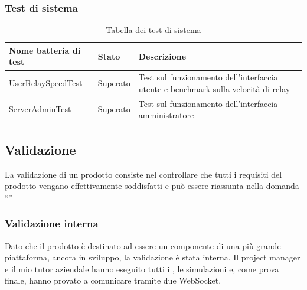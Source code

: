 		\subsubsection{Test di sistema}
		\begin{table}[H]
			\centering
			\begin{tabularx}{\textwidth}{ X X X }
				\toprule
				\textbf{Nome batteria di test} & \textbf{Stato} & \textbf{Descrizione} \\
				\midrule
				UserRelaySpeedTest 	& Superato  & Test sul funzionamento dell'interfaccia utente e benchmark sulla velocità di relay \\ 
				ServerAdminTest 		& Superato 	& Test sul funzionamento dell'interfaccia amministratore \\
			\end{tabularx}
			\caption{Tabella dei test di sistema}	
		\end{table}

	\subsection{Validazione}
	La validazione di un prodotto consiste nel controllare che tutti i requisiti del prodotto vengano effettivamente soddisfatti e può essere riassunta nella domanda ``''
		\subsubsection{Validazione interna}
		Dato che il prodotto è destinato ad essere un componente di una più grande piattaforma, ancora in sviluppo, la validazione è stata interna. Il project manager e il mio tutor aziendale hanno eseguito tutti i , le simulazioni e, come prova finale, hanno provato a comunicare tramite due  WebSocket.

